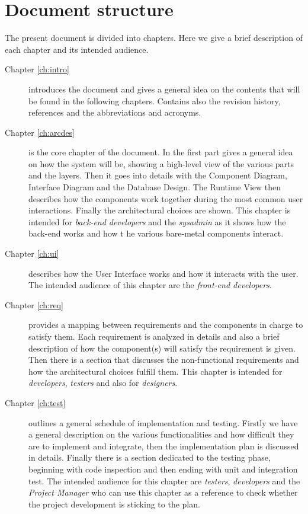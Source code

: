 \section{Document structure}
The present document is divided into chapters. Here we give a brief description
of each chapter and its intended audience.
\begin{description}
    \item[Chapter \ref{ch:intro}] introduces the document and gives a general
    idea on the contents that will be found in the following chapters. Contains
    also the revision history, references and the abbreviations and acronyms.
    \item[Chapter \ref{ch:arcdes}] is the core chapter of the document. In the
    first part gives a general idea on how the system will be, showing a
    high-level view of the various parts and the layers. Then it goes into
    details with the Component Diagram, Interface Diagram and the Database
    Design. The Runtime View then describes how the components work together
    during the most common user interactions. Finally the architectural choices
    are shown. This chapter is intended for \emph{back-end developers} and the
    \emph{sysadmin} as it shows how the back-end works and how t he various
    bare-metal components interact.
    \item[Chapter \ref{ch:ui}] describes how the User Interface works and how it
    interacts with the user. The intended audience of this chapter are the
    \emph{front-end developers}.
    \item[Chapter \ref{ch:req}] provides a mapping between requirements and the
    components in charge to satisfy them. Each requirement is analyzed in
    details and also a brief description of how the component(s) will satisfy
    the requirement is given. Then there is a section that discusses the
    non-functional requirements and how the architectural choices fulfill them.
    This chapter is intended for \emph{developers}, \emph{testers} and also for
    \emph{designers}.
    \item[Chapter \ref{ch:test}] outlines a general schedule of implementation
    and testing. Firstly we have a general description on the various
    functionalities and how difficult they are to implement and integrate, then
    the implementation plan is discussed in details. Finally there is a section
    dedicated to the testing phase, beginning with code inspection and then
    ending with unit and integration test. The intended audience for this
    chapter are \emph{testers}, \emph{developers} and the \emph{Project Manager}
    who can use this chapter as a reference to check whether the project
    development is sticking to the plan.
\end{description}